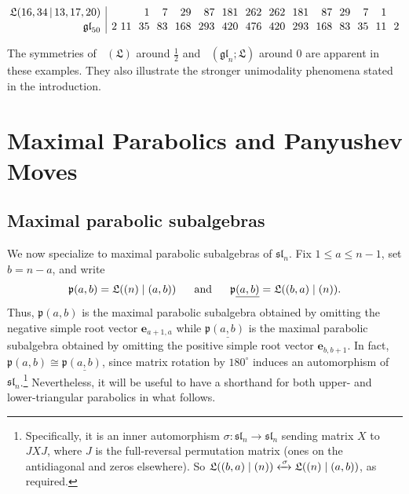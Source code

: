 \documentclass{amsart}
\def\be{\mathbf{e}}
\def\fp{\mathfrak p} %
\def\sl{\mathfrak{sl}}
\def\gl{\mathfrak{gl}}
\def\L{\mathfrak L}
\newcommand{\pab}[1][a,b]{\fp(#1)}
\newcommand{\puab}[1][a,b]{\fp\underline{(#1)}}
\def\sln{\sl_n}
\def\gln{\gl_n}
\def\dimvec{\mathop{\underline{\mathrm{dim}}}}
\def\qand{\quad\hbox{and}\quad}
\theoremstyle{definition}
\begin{document}
\begin{table}[!hbt]
\begin{gather*}
\begin{array}{@{\,}r|r@{\ }r@{\ \ }r@{\ \ }r@{\ \ }r@{\ \ }r@{\ \ }r@{\ \ }r@{\ \ }r@{\ \ }r@{\ \ }r@{\ \ }r@{\ \ }r@{\ \ }r@{\ \ }r@{\,}}
\L(16,34 {\,|\,} 13,17,20) & & &  1 & 7 & 29 & 87 & 181 & 262 & 262 & 181 & 87 & 29 & 7 & 1 
\\[.25ex]
\gl_{50} & 2 & 11 & 35 & 83 & 168 & 293 & 420 & 476 & 420 & 293 & 168 & 83 & 35 & 11 & 2
\end{array}
\end{gather*}
\caption{Dimension vectors for several (bi)parabolic Frobenius subalgebras of $\gl_{50}$.}
\label{tbl:bigger_examples}
\end{table}
The symmetries of $\dimvec(\L)$ around $\frac12$ and
$\dimvec(\gln;\L)$ around $0$ are apparent in these examples.
They also illustrate the stronger unimodality phenomena stated in the
introduction.

\section{Maximal Parabolics and Panyushev Moves}
\label{sec:panyushev}

\subsection{Maximal parabolic subalgebras}
\label{subsec:maximal-parabolics}

We now specialize to maximal parabolic subalgebras of $\sln$. Fix 
$1\leq a\leq n-1$, set $b=n-a$, and write
\[
\pab=\L((n)\mid(a,b))
\ \ \qand \ \ 
\puab = \L((b,a)\mid(n)).
\]
Thus, $\pab$ is the maximal parabolic subalgebra obtained by omitting the 
negative simple root vector $\be_{a+1,a}$ while $\puab$ is the maximal parabolic subalgebra obtained by omitting the 
positive simple root vector $\be_{b,b+1}$. In fact, $\pab \cong \puab$, since matrix rotation by $180^{\circ}$ induces an automorphism of $\sln$.\footnote{Specifically, it is an inner automorphism $\sigma:\sln \rightarrow \sln$ sending matrix $X$ to $JXJ$, where $J$ is the full-reversal permutation matrix (ones on the antidiagonal and zeros elsewhere). So $\L((b,a)\mid(n)) \xleftrightarrow{\,\sigma\,} \L((n)\mid(a,b))$, as required.} 
Nevertheless, it will be useful to have a shorthand for both upper- and lower-triangular parabolics in what follows. 
\end{document}
